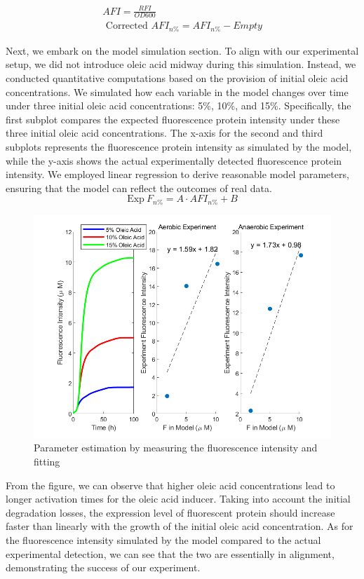 \documentclass[UTF8]{article}
\begin{document}
\begin{equation}
	\begin{gathered}
		A F I=\frac{R F I}{O D 600} \\
		\text { Corrected } A F I_{n \%}=A F I_{n \%}-E m p t y
	\end{gathered}
\end{equation}



Next, we embark on the model simulation section. To align with our  experimental setup, we did not introduce oleic acid midway during this  simulation. Instead, we conducted quantitative computations based on the provision of initial oleic acid concentrations. We simulated how each  variable in the model changes over time under three initial oleic acid  concentrations: 5\%, 10\%, and 15\%. Specifically, the first subplot  compares the expected fluorescence protein intensity under these three  initial oleic acid concentrations. The x-axis for the second and third  subplots represents the fluorescence protein intensity as simulated by  the model, while the y-axis shows the actual experimentally detected  fluorescence protein intensity. We employed linear regression to derive  reasonable model parameters, ensuring that the model can reflect the  outcomes of real data.
\begin{equation}
\text{Exp} \ F_{n\%}  = A \cdot AFI_{n\%} + B
\end{equation}


\begin{figure}[h]
	\centering
	\includegraphics[width=0.75\linewidth]{figures/para_fit_fig.png}
	\caption{Parameter estimation by measuring the fluorescence intensity and fitting}
	\label{fig:parafit}
\end{figure}

From the figure, we can observe that higher oleic acid concentrations  lead to longer activation times for the oleic acid inducer. Taking into  account the initial degradation losses, the expression level of  fluorescent protein should increase faster than linearly with the growth of the initial oleic acid concentration. As for the fluorescence  intensity simulated by the model compared to the actual experimental  detection, we can see that the two are essentially in alignment, demonstrating the success of our experiment.
\end{document}
